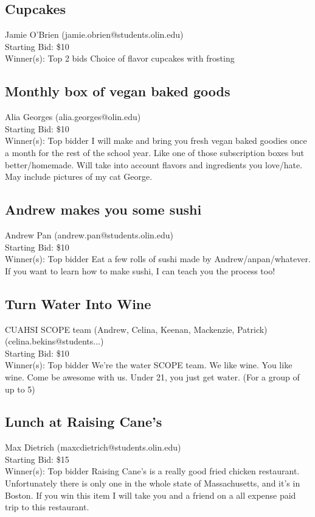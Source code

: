 \documentclass[11pt]{article}
\begin{document}
\subsection{Cupcakes}
Jamie O'Brien (jamie.obrien@students.olin.edu) \\
Starting Bid: \$10 \\
Winner(s): 
Top 2 bids\newline
Choice of flavor cupcakes with  frosting
\subsection{Monthly box of vegan baked goods}
Alia Georges (alia.georges@olin.edu) \\
Starting Bid: \$10 \\
Winner(s): 
Top bidder\newline
I will make and bring you fresh vegan baked goodies once a month for the rest of the school year. Like one of those subscription boxes but better/homemade. Will take into account flavors and ingredients you love/hate. May include pictures of my cat George.
\subsection{Andrew makes you some sushi}
Andrew Pan (andrew.pan@students.olin.edu) \\
Starting Bid: \$10 \\
Winner(s): 
Top bidder\newline
Eat a few rolls of sushi made by Andrew/anpan/whatever.  If you want to learn how to make sushi, I can teach you the process too!
\subsection{Turn Water Into Wine}
CUAHSI SCOPE team (Andrew, Celina, Keenan, Mackenzie, Patrick) (celina.bekins@students...) \\
Starting Bid: \$10 \\
Winner(s): 
Top bidder\newline
We're the water SCOPE team. We like wine. You like wine. Come be awesome with us. Under 21, you just get water. (For a group of up to 5)
\subsection{Lunch at Raising Cane's}
Max Dietrich (maxcdietrich@students.olin.edu) \\
Starting Bid: \$15 \\
Winner(s): 
Top bidder\newline
Raising Cane's is a really good fried chicken restaurant.  Unfortunately there is only one in the whole state of Massachusetts, and it's in Boston.  If you win this item I will take you and a friend on a all expense paid trip to this restaurant.
\end{document}
